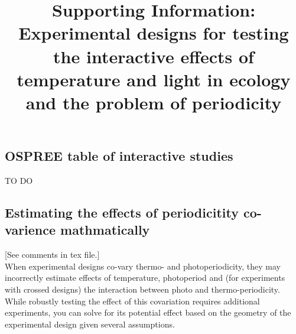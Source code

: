 \documentclass[11pt]{article}
\title{Supporting Information: Experimental designs for testing the interactive effects of temperature and light in ecology and the problem of periodicity }
\begin{document}
\maketitle
\subsection*{OSPREE table of interactive studies}
TO DO


\subsection*{Estimating the effects of periodicitity co-varience mathmatically}
[See comments in tex file.] \\
When experimental designs co-vary thermo- and photoperiodicity, they may incorrectly estimate effects of temperature, photoperiod and (for experiments with crossed designs) the interaction between photo and thermo-periodicity. While robustly testing the effect of this covariation requires additional experiments, you can solve for its potential effect based on the geometry of the experimental design given several assumptions.\\
\end{document}
